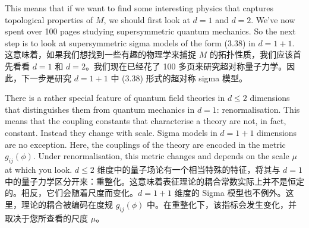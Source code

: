 \documentclass{ctexart}
\begin{document}
\begin{paracol}{2}
This means that if we want to ﬁnd some interesting physics that captures topological properties of $M$, we should ﬁrst look at $d = 1$ and $d = 2$. We’ve now spent over 100 pages studying supersymmetric quantum mechanics. So the next step is to look at supersymmetric sigma models of the form (3.38) in $d = 1 + 1$.
\switchcolumn
这意味着，如果我们想找到一些有趣的物理学来捕捉 $M$ 的拓扑性质，我们应该首先看看 $d = 1$ 和 $d = 2$。我们现在已经花了 100 多页来研究超对称量子力学。因此，下一步是研究 $d = 1 + 1$ 中 (3.38) 形式的超对称 sigma 模型。
\switchcolumn*

There is a rather special feature of quantum ﬁeld theories in $d \leq 2$ dimensions that distinguishes them from quantum mechanics in $d = 1$: renormalisation. This means that the coupling constants that characterise a theory are not, in fact, constant. Instead they change with scale. Sigma models in $d = 1 + 1$ dimensions are no exception. Here, the couplings of the theory are encoded in the metric $g_{ij}(\phi)$. Under renormalisation, this metric changes and depends on the scale $\mu$ at which you look.
\switchcolumn
$d \leq 2$ 维度中的量子场论有一个相当特殊的特征，将其与 $d = 1$ 中的量子力学区分开来：重整化。这意味着表征理论的耦合常数实际上并不是恒定的。相反，它们会随着尺度而变化。$d = 1 + 1$ 维度的 Sigma 模型也不例外。这里，理论的耦合被编码在度规 $g_{ij}(\phi)$ 中。在重整化下，该指标会发生变化，并取决于您所查看的尺度 $\mu$。
\switchcolumn*

\end{paracol}
\end{document}
